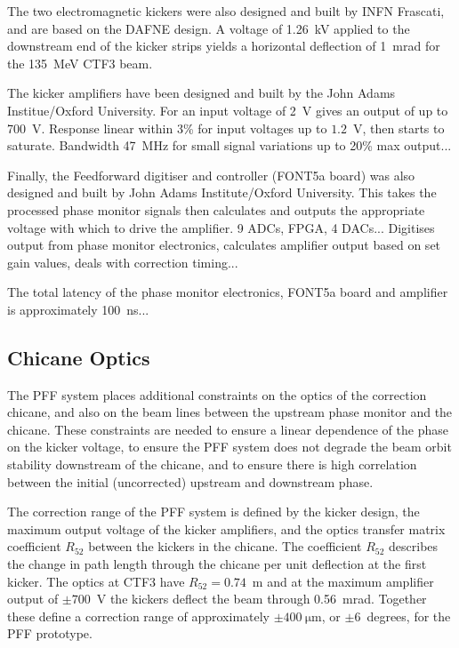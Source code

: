 \documentclass[%
 reprint,
 amsmath,amssymb,
 aps,
]{revtex4-1}
\begin{document}
The two electromagnetic kickers were also designed and built by INFN Frascati,  
and are based on the DAFNE design. A voltage of 1.26~kV applied to the 
downstream end of the kicker strips yields a horizontal deflection of 1~mrad 
for the 135~MeV CTF3 beam.

The kicker amplifiers have been designed and built by the John Adams 
Institue/Oxford University. For 
an input voltage of 2~V gives an output of up to 700~V. Response linear within 
3\% for input voltages up to \(1.2\)~V, then starts to saturate. Bandwidth 
47~MHz for small signal variations up to 20\% max output...

Finally, the Feedforward digitiser and controller (FONT5a board) was also 
designed and built by John Adams Institute/Oxford University. This takes the 
processed phase monitor signals then calculates and outputs the appropriate 
voltage with which to drive the amplifier. 9 ADCs, FPGA, 4 DACs... Digitises 
output from phase monitor electronics, calculates amplifier output based on set 
gain values, deals with correction timing...

The total latency of the phase monitor electronics, FONT5a board and amplifier 
is approximately 100~ns...

\subsection{\label{ss:optics}Chicane Optics}

The PFF system places additional constraints on the optics of the correction 
chicane, and also on the beam lines between the upstream phase monitor and the 
chicane. These constraints are needed to ensure a linear dependence of the 
phase on the kicker voltage, to ensure the PFF system does not degrade the beam 
orbit stability downstream of the chicane, and to ensure there is high 
correlation between the initial (uncorrected) upstream and downstream phase.

The correction range of the PFF system is defined by the kicker design, the 
maximum output voltage of the kicker amplifiers, and the optics transfer matrix 
coefficient \(R_{52}\) between the kickers in the chicane. The coefficient 
\(R_{52}\) describes the change in path length through the chicane per unit 
deflection at the first kicker. The optics at CTF3 have \(R_{52} = 0.74\)~m and 
at the maximum amplifier output 
of \(\pm700\)~V the kickers deflect the beam through 0.56~mrad. Together these 
define a correction range of approximately \(\pm400~\mathrm{\mu m}\), or 
\(\pm6\)~degrees, for the PFF 
prototype.
\end{document}
